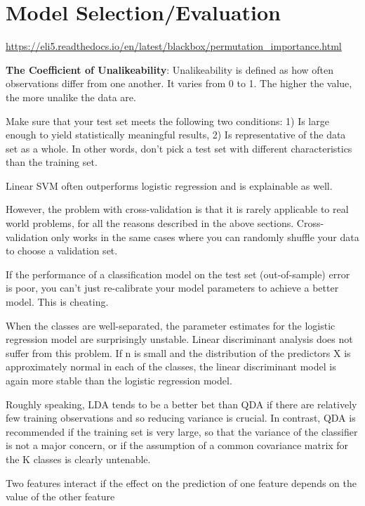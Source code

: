 \documentclass[]{book}
\begin{document}
\hypertarget{model-selectionevaluation}{%
\section{Model Selection/Evaluation}\label{model-selectionevaluation}}

\url{https://eli5.readthedocs.io/en/latest/blackbox/permutation_importance.html}

\textbf{The Coefficient of Unalikeability}: Unalikeability is defined as how often observations differ from one another. It varies from 0 to 1. The higher the value, the more unalike the data are.

Make sure that your test set meets the following two conditions: 1) Is large enough to yield statistically meaningful results, 2) Is representative of the data set as a whole. In other words, don't pick a test set with different characteristics than the training set.

Linear SVM often outperforms logistic regression and is explainable as well.

However, the problem with cross-validation is that it is rarely applicable to real world problems, for all the reasons described in the above sections. Cross-validation only works in the same cases where you can randomly shuffle your data to choose a validation set.

If the performance of a classification model on the test set (out-of-sample) error is poor, you can't just re-calibrate your model parameters to achieve a better model. This is cheating.

When the classes are well-separated, the parameter estimates for the logistic regression model are surprisingly unstable. Linear discriminant analysis does not suffer from this problem. If n is small and the distribution of the predictors X is approximately normal in each of the classes, the linear discriminant model is again more stable than the logistic regression model.

Roughly speaking, LDA tends to be a better bet than QDA if there are relatively few training observations and so reducing variance is crucial. In contrast, QDA is recommended if the training set is very large, so that the variance of the classifier is not a major concern, or if the assumption of a common covariance matrix for the K classes is clearly untenable.

Two features interact if the effect on the prediction of one feature depends on the value of the other feature
\end{document}
